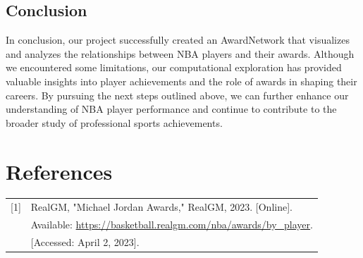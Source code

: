 \documentclass[fontsize=11pt]{article}
\begin{document}
\subsection{Conclusion}

In conclusion, our project successfully created an AwardNetwork that visualizes and analyzes the relationships between NBA players and their awards. Although we encountered some limitations, our computational exploration has provided valuable insights into player achievements and the role of awards in shaping their careers. By pursuing the next steps outlined above, we can further enhance our understanding of NBA player performance and continue to contribute to the broader study of professional sports achievements.


\section{References}

\begin{tabular}{@{}p{0.5cm}p{14cm}@{}}
    [1] & RealGM, "Michael Jordan Awards," RealGM, 2023. [Online]. \\
        & Available: \url{https://basketball.realgm.com/nba/awards/by_player}. \\
        & [Accessed: April 2, 2023]. \\
\end{tabular}




\end{document}
